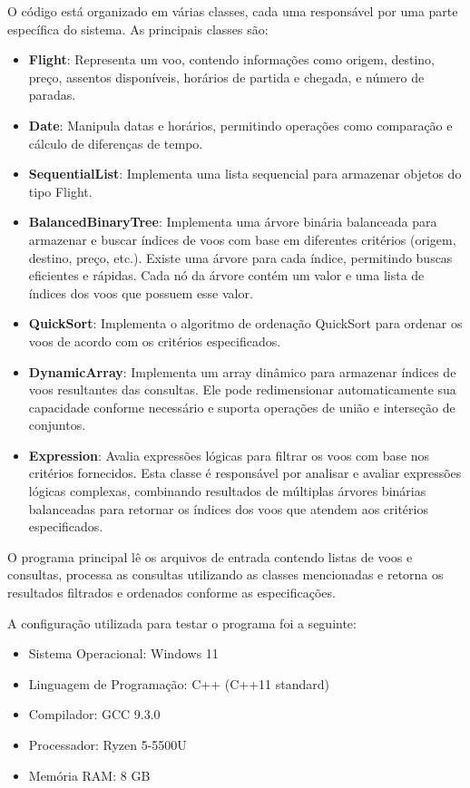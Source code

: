 \documentclass[a4paper,12pt]{article}
\begin{document}
O código está organizado em várias classes, cada uma responsável por uma parte específica do sistema. As principais classes são:

\begin{itemize}
    \item \textbf{Flight}: Representa um voo, contendo informações como origem, destino, preço, assentos disponíveis, horários de partida e chegada, e número de paradas.
    \item \textbf{Date}: Manipula datas e horários, permitindo operações como comparação e cálculo de diferenças de tempo.
    \item \textbf{SequentialList}: Implementa uma lista sequencial para armazenar objetos do tipo Flight.
    \item \textbf{BalancedBinaryTree}: Implementa uma árvore binária balanceada para armazenar e buscar índices de voos com base em diferentes critérios (origem, destino, preço, etc.). Existe uma árvore para cada índice, permitindo buscas eficientes e rápidas. Cada nó da árvore contém um valor e uma lista de índices dos voos que possuem esse valor.
    \item \textbf{QuickSort}: Implementa o algoritmo de ordenação QuickSort para ordenar os voos de acordo com os critérios especificados.
    \item \textbf{DynamicArray}: Implementa um array dinâmico para armazenar índices de voos resultantes das consultas. Ele pode redimensionar automaticamente sua capacidade conforme necessário e suporta operações de união e interseção de conjuntos.
    \item \textbf{Expression}: Avalia expressões lógicas para filtrar os voos com base nos critérios fornecidos. Esta classe é responsável por analisar e avaliar expressões lógicas complexas, combinando resultados de múltiplas árvores binárias balanceadas para retornar os índices dos voos que atendem aos critérios especificados.
\end{itemize}

O programa principal lê os arquivos de entrada contendo listas de voos e consultas, processa as consultas utilizando as classes mencionadas e retorna os resultados filtrados e ordenados conforme as especificações.

A configuração utilizada para testar o programa foi a seguinte:
\begin{itemize}
    \item Sistema Operacional: Windows 11
    \item Linguagem de Programação: C++ (C++11 standard)
    \item Compilador: GCC 9.3.0
    \item Processador: Ryzen 5-5500U
    \item Memória RAM: 8 GB
\end{itemize}
\end{document}
